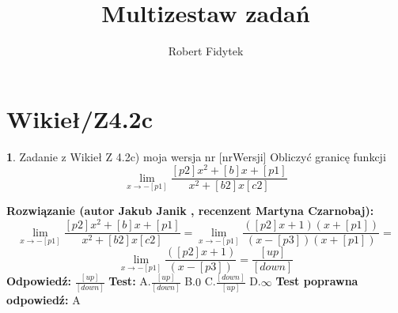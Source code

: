 \documentclass[12pt, a4paper]{article}
\title{Multizestaw zadań}
\author{Robert Fidytek}
\date{}
\theoremstyle{definition} %
\newtheorem{zad}{}
\newcommand{\kategoria}[1]{\section{#1}} %
\newcommand{\zadStart}[1]{\begin{zad}#1\newline} %
\newcommand{\zadStop}{\end{zad}}   %
\newcommand{\rozwStart}[2]{\noindent \textbf{Rozwiązanie (autor #1 , recenzent #2): }\newline} %
\newcommand{\rozwStop}{\newline}                                            %
\newcommand{\odpStart}{\noindent \textbf{Odpowiedź:}\newline}    %
\newcommand{\odpStop}{\newline}                                             %
\newcommand{\testStart}{\noindent \textbf{Test:}\newline} %
\newcommand{\testStop}{\newline} %
\newcommand{\kluczStart}{\noindent \textbf{Test poprawna odpowiedź:}\newline} %
\newcommand{\kluczStop}{\newline} %
\begin{document}
\maketitle


\kategoria{Wikieł/Z4.2c}
\zadStart{Zadanie z Wikieł Z 4.2c) moja wersja nr [nrWersji]}
Obliczyć granicę funkcji $$\lim_{x \to -[p1]} \frac{[p2]x^2 +[b]x+[p1]}{x^2 + [b2]x [c2]}$$
\zadStop
\rozwStart{Jakub Janik}{Martyna Czarnobaj}
$$\lim_{x \to -[p1]} \frac{[p2]x^2 +[b]x+[p1]}{x^2 + [b2]x [c2]}=\lim_{x \to -[p1]} \frac{([p2]x+1)(x+[p1])}{(x-[p3])(x+[p1])}=$$
$$\lim_{x \to -[p1]} \frac{([p2]x+1)}{(x-[p3])}=\frac{[up]}{[down]}$$
\rozwStop
\odpStart
$\frac{[up]}{[down]}$
\odpStop
\testStart
A.$\frac{[up]}{[down]}$
B.$0$
C.$\frac{[down]}{[up]}$
D.$\infty$
\testStop
\kluczStart
A
\kluczStop
\end{document}
